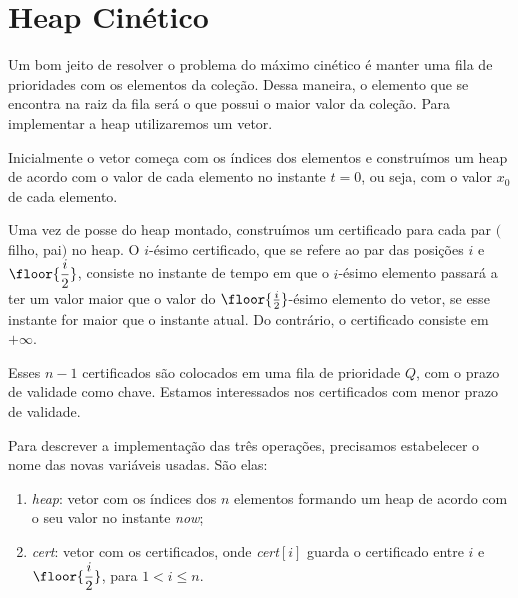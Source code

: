 
\section{Heap Cinético}
\label{heap:secao}
Um bom jeito de resolver o problema do máximo cinético é
manter uma fila de prioridades com os elementos da coleção.
Dessa maneira, o elemento que se encontra na raiz da fila
será o que possui o maior valor da coleção.
Para implementar a heap utilizaremos um vetor.

Inicialmente o vetor começa com os índices dos elementos
e construímos um heap de acordo com o valor de cada elemento
no instante $t = 0$, ou seja, com o valor $x_0$ de cada elemento.

Uma vez de posse do heap montado, construímos um certificado
para cada par $($filho, pai$)$ no heap. O $i$-ésimo certificado,
que se refere ao par das posições $i$ e $\floor{\dfrac{i}{2}}$,
consiste no instante de tempo em que o $i$-ésimo elemento
passará a ter um valor maior que o valor do
$\floor{\frac{i}{2}}$-ésimo elemento do vetor,
se esse instante for maior que o instante atual.
Do contrário, o certificado consiste em $+\infty$. %


Esses $n - 1$ certificados são colocados em uma fila de
prioridade $Q$, com o prazo de validade como chave. Estamos
interessados nos certificados com menor prazo de validade.

Para descrever a implementação das três operações, precisamos
estabelecer o nome das novas variáveis usadas. São elas:
\begin{enumerate}
    \item \textit{heap}: vetor com os índices dos $n$ elementos
    formando um heap de acordo com o seu valor no instante
    \textit{now};
    \item \textit{cert}: vetor com os certificados, onde
    \textit{cert}$[i]$ guarda o certificado entre $i$ e
    $\floor{\dfrac{i}{2}}$, para $1 < i \leq n$.
\end{enumerate}

